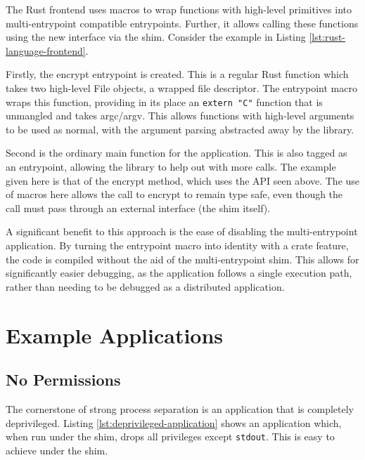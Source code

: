 \documentclass[sigplan]{acmart}
\begin{document}
The Rust frontend uses macros to wrap functions with high-level primitives into multi-entrypoint compatible entrypoints. Further, it allows calling these functions using the new interface via the shim. Consider the example in Listing \ref{lst:rust-language-frontend}.

Firstly, the encrypt entrypoint is created. This is a regular Rust function which takes two high-level File objects, a wrapped file descriptor. The entrypoint macro wraps this function, providing in its place an \texttt{extern "C"} function that is unmangled and takes argc/argv. This allows functions with high-level arguments to be used as normal, with the argument parsing abstracted away by the library.

Second is the ordinary main function for the application. This is also tagged as an entrypoint, allowing the library to help out with more calls. The example given here is that of the encrypt method, which uses the API seen above. The use of macros here allows the call to encrypt to remain type safe, even though the call must pass through an external interface (the shim itself).

A significant benefit to this approach is the ease of disabling the multi-entrypoint application. By turning the entrypoint macro into identity with a crate feature, the code is compiled without the aid of the multi-entrypoint shim. This allows for significantly easier debugging, as the application follows a single execution path, rather than needing to be debugged as a distributed application.

\fi %


\section{Example Applications}

\subsection{No Permissions}

The cornerstone of strong process separation is an application that is completely deprivileged. Listing \ref{lst:deprivileged-application} shows an application which, when run under the shim, drops all privileges except \texttt{stdout}. This is easy to achieve under the shim.
\end{document}
